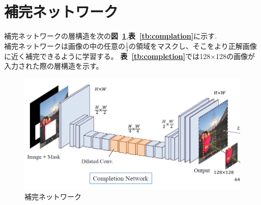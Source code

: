 \documentclass[a4j, 11pt]{jreport}
\newcommand{\figref}[1]{\textbf{図~\ref{#1}}}
\newcommand{\tabref}[1]{\textbf{表~\ref{#1}}}
\begin{document}
\section{補完ネットワーク}
補完ネットワークの層構造を次の\figref{fig:completion},\tabref{tb:complation}に示す.\\
補完ネットワークは画像の中の任意の$\frac{1}{4}$の領域をマスクし、そこをより正解画像に近く補完できるように学習する。
\tabref{tb:completion}では128×128の画像が入力された際の層構造を示す。
\begin{figure}[H]
	\centering
	\includegraphics[width=\linewidth]{images/old-study/completion_network.png}
	\caption{補完ネットワーク}
	\label{fig:completion}
\end{figure}
\end{document}
